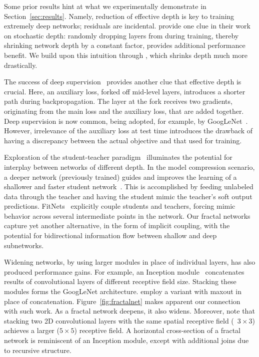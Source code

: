 Some prior results hint at what we experimentally demonstrate in
Section~\ref{sec:results}.  Namely, reduction of effective depth is key to
training extremely deep networks; residuals are incidental.
\cite{huang2016stochasticdepth} provide one clue in their work on stochastic
depth: randomly dropping layers from {\resnet} during training, thereby
shrinking network depth by a constant factor, provides additional performance
benefit.  We build upon this intuition through {\droppath}, which shrinks depth
much more drastically.

The success of deep supervision~\citep{lee2014deeply} provides another clue
that effective depth is crucial.  Here, an auxiliary loss, forked off mid-level
layers, introduces a shorter path during backpropagation.  The layer at the
fork receives two gradients, originating from the main loss and the auxiliary
loss, that are added together.  Deep supervision is now common, being adopted,
for example, by GoogLeNet~\citep{szegedy2015inception}.  However, irrelevance
of the auxiliary loss at test time introduces the drawback of having a
discrepancy between the actual objective and that used for training.

Exploration of the student-teacher paradigm~\citep{ba2014dodeep} illuminates
the potential for interplay between networks of different depth.  In the model
compression scenario, a deeper network (previously trained) guides and improves
the learning of a shallower and faster student network~\citep{ba2014dodeep,
urban2016dodeepsfollowup}.  This is accomplished by feeding unlabeled data
through the teacher and having the student mimic the teacher's soft output
predictions.  FitNets~\citep{romero2014fitnets} explicitly couple students and
teachers, forcing mimic behavior across several intermediate points in the
network.  Our fractal networks capture yet another alternative, in the form of
implicit coupling, with the potential for bidirectional information flow
between shallow and deep subnetworks.

Widening networks, by using larger modules in place of individual layers, has
also produced performance gains.  For example, an Inception module~\citep{
szegedy2015inception} concatenates results of convolutional layers of different
receptive field size.  Stacking these modules forms the GoogLeNet architecture.
\cite{liao2015competitive} employ a variant with maxout in place of
concatenation.  Figure~\ref{fig:fractalnet} makes apparent our connection with
such work.  As a fractal network deepens, it also widens.  Moreover, note that
stacking two 2D convolutional layers with the same spatial receptive field
(\eg~$3 \times 3$) achieves a larger ($5 \times 5$) receptive field.  A
horizontal cross-section of a fractal network is reminiscent of an Inception
module, except with additional joins due to recursive structure.
